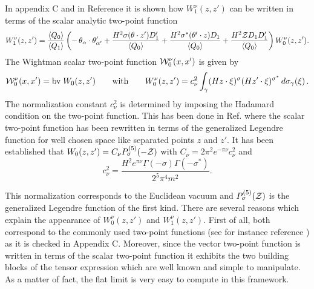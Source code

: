 \documentclass[a4paper,11pt,showpacs,preprintnumbers]{revtex4}
\def\z {{\cal Z}}
\begin{document}
In appendix C and in Reference \cite{gata} it is shown how $
W^{\nu}_{1}(z,z')$ can be written in terms of the scalar analytic
two-point function
\begin{equation}
W^{\nu}_{1}(z,z') =\frac{\langle Q_{0}\rangle }{\langle
Q_{1}\rangle}\left(-\,\theta_{\alpha}\cdot\theta'_{\alpha'}+
\frac{H^{2}\sigma(\theta\cdot z' )D'_{1}}{\langle Q_{0}\rangle }+
\frac{H^{2}\sigma^{*}(\theta'\cdot z) D_{1}}{\langle Q_{0}\rangle
}+ \frac{ H^2\z D_{1}D'_{1}}{\langle Q_{0}\rangle}\right)
W^{\nu}_{0}(z,z').\label{eq:vec}
\end{equation}
The Wightman scalar two-point function ${\cal W}^{\nu}_{0}(x,x')$
is given by \cite{brmo}
\begin{equation}\label{eq:sca}
{\cal
W}^{\nu}_{0}(x,x')=\mbox{bv}\;W_{0}(z,z')\qquad\mbox{with}\qquad
W^\nu_{0}(z,z')= c_\nu^{2}\int_\gamma (Hz\cdot\xi)^{\sigma}(H
z'\cdot \xi )^{\sigma^{*}}\,d\sigma_\gamma(\xi)\,.
\end{equation}
The normalization constant $c_{\nu}^{2}$ is determined by imposing
the Hadamard condition on the two-point function. This has been
done in Ref. \cite{brmo} where the scalar two-point function has
been rewritten in terms of the generalized Legendre function  for
well chosen space like separated points $z$ and $z'$. It has been
established that $W_{0}(z,z') = C_\nu P_{\sigma}^{(5)}(-\z)$ with
$C_{\nu}=2\pi^2 e^{-\pi \nu} c_\nu^{2}$ and
\begin{equation}
c_\nu^{2}=\frac{H^2e^{\pi\nu}\Gamma(-\sigma)\Gamma(-\sigma^{*})}{2^5\pi^4
m^{2}}. \label{eq:nor}
\end{equation}




This normalization corresponds to the Euclidean vacuum \cite{brmo}
and $P_{\sigma}^{(5)}(\z)$ is the generalized Legendre function of
the first kind. There are several reasons which explain the
appearance of $W^{\nu}_{0}(z,z')$ and $ W_{1}^{\nu}(z,z')$. First
of all, both correspond to the commonly used two-point functions
(see for instance reference \cite{allen}) as it is checked in
Appendix C. Moreover, since the vector two-point function is
written in terms of the scalar two-point function it exhibits the
two building blocks of the tensor expression which are well known
and simple to manipulate. As a matter of fact, the flat limit is
very easy to compute in this framework.
\end{document}
